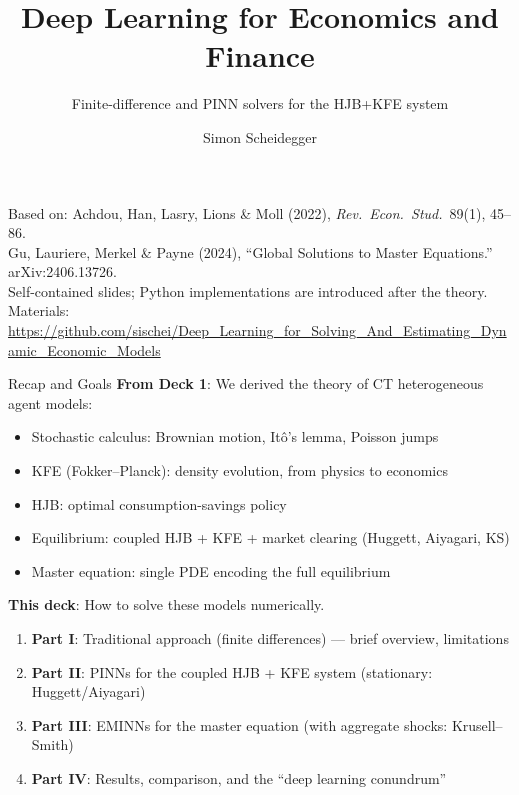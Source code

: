 \documentclass[aspectratio=169,11pt]{beamer}
\title[Deep Learning for Dynamic Economic Models]
{Deep Learning for Economics and Finance}
\subtitle{Finite-difference and PINN solvers for the HJB+KFE system}
\author{Simon Scheidegger}
\institute[HEC Lausanne]{HEC, University of Lausanne}
\date{}
\newcommand{\emphc}[1]{\textcolor{harvardcrimson}{#1}}
\begin{document}

{
\begin{frame}
\titlepage
\vspace{-0.4cm}
\begin{center}
{\footnotesize Based on: Achdou, Han, Lasry, Lions \& Moll (2022), \emph{Rev.\ Econ.\ Stud.}\ 89(1), 45--86.}\\[2pt]
{\footnotesize Gu, Lauriere, Merkel \& Payne (2024), ``Global Solutions to Master Equations.'' arXiv:2406.13726.}\\[2pt]
{\footnotesize Self-contained slides; Python implementations are introduced after the theory.}\\[4pt]
{\footnotesize Materials: \url{https://github.com/sischei/Deep_Learning_for_Solving_And_Estimating_Dynamic_Economic_Models}}
\end{center}
\end{frame}
}

\begin{frame}{Recap and Goals}
\textbf{From Deck 1}: We derived the \emphc{theory} of CT heterogeneous agent models:
\begin{itemize}\itemsep2pt
    \item Stochastic calculus: Brownian motion, It\^o's lemma, Poisson jumps
    \item KFE (Fokker--Planck): density evolution, from physics to economics
    \item HJB: optimal consumption-savings policy
    \item Equilibrium: coupled HJB + KFE + market clearing (Huggett, Aiyagari, KS)
    \item Master equation: single PDE encoding the full equilibrium
\end{itemize}

\vspace{0.4em}
\textbf{This deck}: How to \emphc{solve} these models numerically.
\begin{enumerate}\itemsep3pt
    \item \textbf{Part I}: Traditional approach (finite differences) --- brief overview, limitations
    \item \textbf{Part II}: \emphc{PINNs for the coupled HJB + KFE system} (stationary: Huggett/Aiyagari)
    \item \textbf{Part III}: \emphc{EMINNs for the master equation} (with aggregate shocks: Krusell--Smith)
    \item \textbf{Part IV}: Results, comparison, and the ``deep learning conundrum''
\end{enumerate}
\end{frame}
\end{document}

